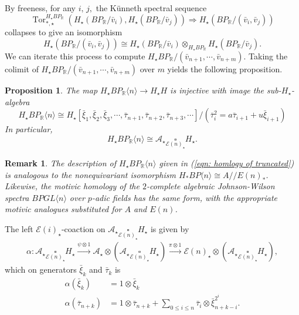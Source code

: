 \documentclass{amsart}
\newtheorem{proposition}[equation]{Proposition}
\newtheorem{remark}[equation]{Remark}
\theoremstyle{plain}
\numberwithin{equation}{section}
\numberwithin{figure}{section}
\DeclareMathOperator{\Tor}{Tor}
\newcommand{\mR}{{\mathbb R}}
\newcommand{\cA}{{\mathcal A}}
\newcommand{\0}{\langle 0 \rangle }
\newcommand{\n}{\langle n \rangle }
\begin{document}
By freeness, for any $i, \, j,$ the K\"{u}nneth spectral sequence 
    \[
    \Tor_{*, \star}^{H_\star BP_\mR} (H_\star (BP_\mR / \bar{v}_i), H_\star (BP_\mR / \bar{v}_j)) \Longrightarrow H_\star (BP_\mR / (\bar{v}_i, \bar{v}_j))
    \]
    collapses to give an isomorphism
    \[
    H_\star (BP_\mR / (\bar{v}_i, \bar{v}_j)) \cong H_\star (BP_\mR / \bar{v}_i) \otimes_{H_\star BP_\mR} H_\star (BP_\mR / \bar{v}_j). 
    \]
We can iterate this process to compute  $H_\star BP_\mR / (\bar{v}_{n + 1}, \cdots, \bar{v}_{n + m})$. Taking the colimit of $H_\star BP_\mR / (\bar{v}_{n + 1}, \cdots, \bar{v}_{n + m})$ over $m$ yields the following proposition.
\begin{proposition} \label{prop:BPRnHomology}
    The map $H_\star BP_\mR \langle n \rangle \to H_\star H$ is injective with image the sub-$H_\star$-algebra
    \[
    H_\star BP_\mR \langle n \rangle \cong H_\star [ \bar{\xi}_1, \bar{\xi}_2, \bar{\xi}_3, \cdots , \bar{\tau}_{n + 1}, \bar{\tau}_{n + 2}, \bar{\tau}_{n + 3}, \cdots] / (\bar{\tau}_i^2 = a \bar{\tau}_{i + 1} + u \bar{\xi}_{i + 1})
    \]
    In particular,
    \begin{equation}\label{eqn: homlogy of truncated}
    H_\star BP_\mR \langle n \rangle \cong \cA_\star \underset{\mathcal{E} (n)_{\star}}{\square} H_\star.
    \end{equation}
\end{proposition}

\begin{remark}
    \rm{The description of $H_{\star}BP_{\mR}\n$ given in (\ref{eqn: homlogy of truncated}) is analogous to the nonequivariant isomorphism $H_{*}BP\n \cong A//E(n)_{*}$. Likewise, the motivic homology of the $2$-complete algebraic Johnson-Wilson spectra $BPGL \langle n \rangle$ over $p$-adic fields \cite[Theorem~3.9]{Ormsby2011} has the same form, with the appropriate motivic analogues substituted for $A$ and $E(n)$.}
\end{remark}
The left $\mathcal{E}(i)_\star$-coaction on $\cA_\star \underset{\mathcal{E} (n)_\star}{\square} H_\star$ is given by
\begin{align} \alpha: \cA_\star \underset{\mathcal{E} (n)_\star}{\square} H_\star \overset{\psi \otimes 1}\longrightarrow \cA_\star \otimes \left(\cA_\star \underset{\mathcal{E} (n)_\star}{\square} H_\star\right) \overset{\pi \otimes 1}\longrightarrow \mathcal{E} (n)_\star \otimes \left(\cA_\star \underset{\mathcal{E} (n)_\star}{\square} H_\star \right), \label{eq:Ecoaction}
\end{align}
which on generators $\bar{\xi}_k$ and $\bar{\tau}_k$ is 
\begin{align*} 
    \alpha (\bar{\xi}_k) & = 1 \otimes \bar{\xi}_k \\
    \alpha(\bar{\tau}_{n + k}) & = 1 \otimes \bar{\tau}_{n + k} + \sum_{0 \leq i \leq n} \bar{\tau}_{i} \otimes \bar{\xi}_{n + k -i}^{2^i}.
\end{align*}
\end{document}
